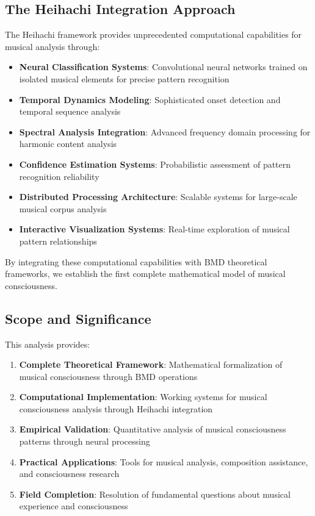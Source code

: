 \documentclass[12pt,a4paper]{article}
\begin{document}
\subsection{The Heihachi Integration Approach}

The Heihachi framework provides unprecedented computational capabilities for musical analysis through:

\begin{itemize}
\item \textbf{Neural Classification Systems}: Convolutional neural networks trained on isolated musical elements for precise pattern recognition
\item \textbf{Temporal Dynamics Modeling}: Sophisticated onset detection and temporal sequence analysis
\item \textbf{Spectral Analysis Integration}: Advanced frequency domain processing for harmonic content analysis
\item \textbf{Confidence Estimation Systems}: Probabilistic assessment of pattern recognition reliability
\item \textbf{Distributed Processing Architecture}: Scalable systems for large-scale musical corpus analysis
\item \textbf{Interactive Visualization Systems}: Real-time exploration of musical pattern relationships
\end{itemize}

By integrating these computational capabilities with BMD theoretical frameworks, we establish the first complete mathematical model of musical consciousness.

\subsection{Scope and Significance}

This analysis provides:

\begin{enumerate}
\item \textbf{Complete Theoretical Framework}: Mathematical formalization of musical consciousness through BMD operations
\item \textbf{Computational Implementation}: Working systems for musical consciousness analysis through Heihachi integration
\item \textbf{Empirical Validation}: Quantitative analysis of musical consciousness patterns through neural processing
\item \textbf{Practical Applications}: Tools for musical analysis, composition assistance, and consciousness research
\item \textbf{Field Completion}: Resolution of fundamental questions about musical experience and consciousness
\end{enumerate}
\end{document}
